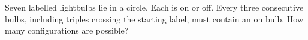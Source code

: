 Seven labelled lightbulbs lie in a circle. Each is on or off. Every three consecutive bulbs, including triples crossing the starting label, must contain an on bulb. How many configurations are possible?
